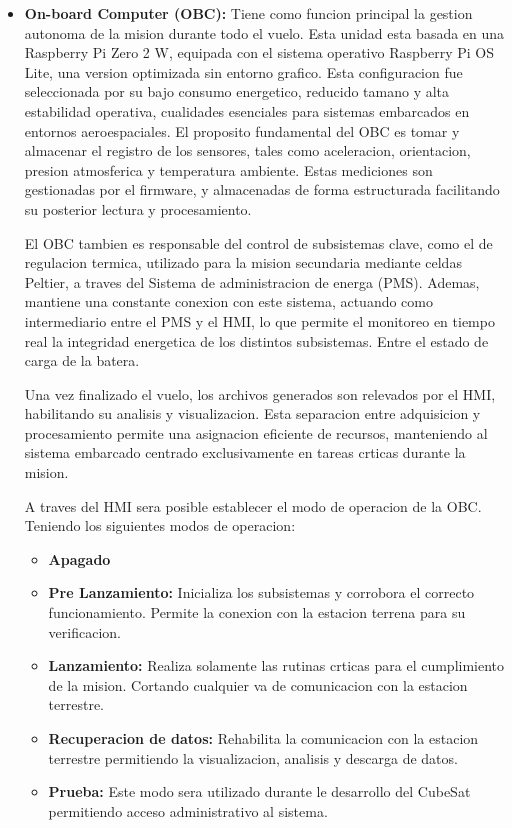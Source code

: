 \begin{itemize}
      \item \textbf{On-board Computer (OBC):} Tiene como funcion principal la gestion autonoma de
      la mision durante todo el vuelo. Esta unidad esta basada en una Raspberry Pi Zero 2
      W, equipada con el sistema operativo Raspberry Pi OS Lite, una version optimizada sin
      entorno grafico. Esta configuracion fue seleccionada por su bajo consumo energetico,
      reducido tamano y alta estabilidad operativa, cualidades esenciales para sistemas embarcados en entornos aeroespaciales.
      El proposito fundamental del OBC es tomar y almacenar el registro de los sensores,
      tales como aceleracion, orientacion, presion atmosferica y temperatura ambiente. Estas
      mediciones son gestionadas por el firmware, y almacenadas de forma estructurada
      facilitando su posterior lectura y procesamiento.

      El OBC tambien es responsable del control de subsistemas clave, como el de regulacion
      termica, utilizado para la mision secundaria mediante celdas Peltier, a traves del Sistema de
      administracion de energa (PMS). Ademas, mantiene una constante conexion
      con este sistema, actuando como intermediario entre el PMS y el HMI, lo que permite
      el monitoreo en tiempo real la integridad energetica de los distintos subsistemas. Entre
      el estado de carga de la batera.

      Una vez finalizado el vuelo, los archivos generados son relevados por el HMI, habilitando
      su analisis y visualizacion. Esta separacion entre adquisicion y procesamiento permite una asignacion
      eficiente de recursos, manteniendo al sistema embarcado centrado
      exclusivamente en tareas crticas durante la mision.

      A traves del HMI sera posible establecer el modo de operacion de la OBC. Teniendo los siguientes modos de operacion:
      \begin{itemize}
         \item \textbf{Apagado}
         \item \textbf{Pre Lanzamiento:} Inicializa los subsistemas y corrobora el correcto funcionamiento.
          Permite la conexion con la estacion terrena para su verificacion.
         \item \textbf{Lanzamiento:} Realiza solamente las rutinas crticas para el cumplimiento de la
        mision. Cortando cualquier va de comunicacion con la estacion terrestre.
         \item \textbf{Recuperacion de datos:} Rehabilita la comunicacion con la estacion terrestre
        permitiendo la visualizacion, analisis y descarga de datos.
         \item \textbf{Prueba:} Este modo sera utilizado durante le desarrollo del CubeSat permitiendo
        acceso administrativo al sistema.
      \end{itemize}


\end{itemize}

